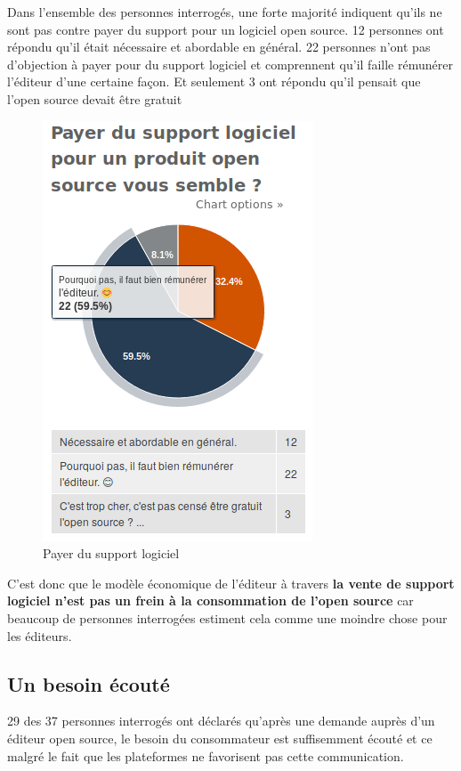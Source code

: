 			Dans l'ensemble des personnes interrogés, une forte majorité indiquent qu'ils ne sont pas contre payer du support pour un logiciel open source. 12 personnes ont répondu qu'il était nécessaire et abordable en général. 22 personnes n'ont pas d'objection à payer pour du support logiciel et comprennent qu'il faille rémunérer l'éditeur d'une certaine façon. Et seulement 3 ont répondu qu'il pensait que l'open source devait être gratuit

			\begin{figure}[ht]
				\center
				\includegraphics[scale=0.58]{./img/a11}
				\caption{Payer du support logiciel}					
			\end{figure}

			C'est donc que le modèle économique de l'éditeur à travers \textbf{la vente de support logiciel n'est pas un frein à la consommation de l'open source} car beaucoup de personnes interrogées estiment cela comme une moindre chose pour les éditeurs.

		\subsection{Un besoin écouté}

		29 des 37 personnes interrogés ont déclarés qu'après une demande auprès d'un éditeur open source, le besoin du consommateur est suffisemment écouté et ce malgré le fait que les plateformes ne favorisent pas cette communication.

